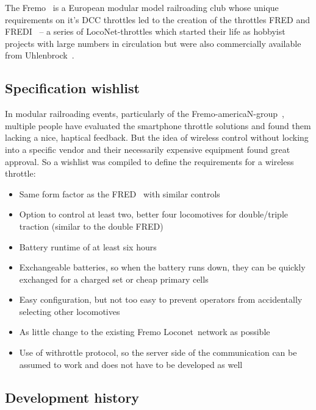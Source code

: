 \documentclass[11pt,a4paper]{scrartcl}
\begin{document}
The Fremo~\cite{fremo} is a European modular model railroading club whose unique requirements on it's DCC throttles led to the creation of the throttles FRED and FREDI~\cite{fred} -- a series of LocoNet\textregistered-throttles which started their life as hobbyist projects with large numbers in circulation but were also commercially available from Uhlenbrock~\cite{uhlenbrock}.

\subsection{Specification wishlist}

In modular railroading events, particularly of the Fremo-americaN-group~\cite{fremo}, multiple people have evaluated the smartphone throttle solutions and found them lacking a nice, haptical feedback. But the idea of wireless control without locking into a specific vendor and their necessarily expensive equipment found great approval. So a wishlist was compiled to define the requirements for a wireless throttle:
\begin{itemize}
\item Same form factor as the FRED~\cite{fred} with similar controls
\item Option to control at least two, better four locomotives for double/triple traction (similar to the double FRED)
\item Battery runtime of at least six hours
\item Exchangeable batteries, so when the battery runs down, they can be quickly exchanged for a charged set or cheap primary cells
\item Easy configuration, but not too easy to prevent operators from accidentally selecting other locomotives
\item As little change to the existing Fremo Loconet\textregistered\ network as possible
\item Use of withrottle protocol, so the server side of the communication can be assumed to work and does not have to be developed as well
\end{itemize}

\subsection{Development history}
\end{document}
